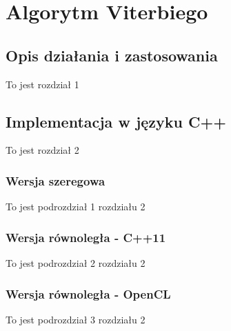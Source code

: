 \documentclass[document.tex]{subfiles}
\begin{document}
\chapter{Algorytm Viterbiego}
\section{Opis działania i zastosowania}
To jest rozdział 1
\section{Implementacja w języku C++}
To jest rozdział 2
	\subsection{Wersja szeregowa}
	To jest podrozdział 1 rozdziału 2
	\subsection{Wersja równoległa - C++11}
	To jest podrozdział 2 rozdziału 2
	\subsection{Wersja równoległa - OpenCL}
	To jest podrozdział 3 rozdziału 2
\end{document}
